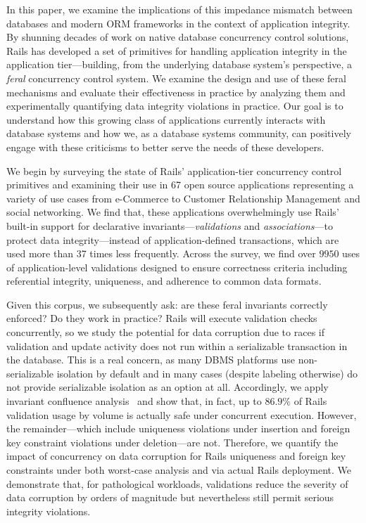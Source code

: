 In this paper, we examine the implications of this impedance mismatch
between databases and modern ORM frameworks in the context of
application integrity. By shunning decades of work on native database
concurrency control solutions, Rails has developed a set of primitives
for handling application integrity in the application tier---building,
from the underlying database system's perspective, a \textit{feral}
concurrency control system. We examine the design and use of these
feral mechanisms and evaluate their effectiveness in practice by
analyzing them and experimentally quantifying data integrity
violations in practice. Our goal is to understand how this growing
class of applications currently interacts with database systems and
how we, as a database systems community, can positively engage with
these criticisms to better serve the needs of these developers.

We begin by surveying the state of Rails' application-tier concurrency
control primitives and examining their use in 67 open source
applications representing a variety of use cases from e-Commerce to
Customer Relationship Management and social networking. We find that,
these applications overwhelmingly use Rails' built-in support for
declarative invariants---\textit{validations} and
\textit{associations}---to protect data integrity---instead of
application-defined transactions, which are used more than 37 times less
frequently. Across the survey, we find over $9950$ uses of
application-level validations designed to ensure correctness criteria
including referential integrity, uniqueness, and adherence to common
data formats.

Given this corpus, we subsequently ask: are these feral invariants
correctly enforced? Do they work in practice? Rails will execute
validation checks concurrently, so we study the potential for data
corruption due to races if validation and update activity does not run
within a serializable transaction in the database. This is a real
concern, as many DBMS platforms use non-serializable isolation by
default and in many cases (despite labeling otherwise) do not provide
serializable isolation as an option at all.  Accordingly, we apply
invariant confluence analysis~\cite{coord-avoid} and show that, in
fact, up to $86.9\%$ of Rails validation usage by volume is actually
safe under concurrent execution. However, the remainder---which
include uniqueness violations under insertion and foreign key
constraint violations under deletion---are not. Therefore, we quantify
the impact of concurrency on data corruption for Rails uniqueness and
foreign key constraints under both worst-case analysis and via actual
Rails deployment. We demonstrate that, for pathological workloads,
validations reduce the severity of data corruption by orders of
magnitude but nevertheless still permit serious integrity violations.

